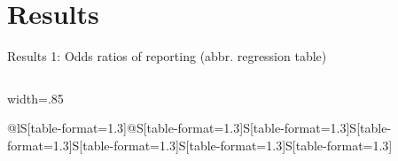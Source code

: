 \documentclass{beamer}
\begin{document}
	\section{Results}
	\begin{frame}{\small Results 1: Odds ratios of reporting (abbr. regression table)}
		\begin{columns}
			\column{\dimexpr\paperwidth-20pt}
			\centering
			\begin{adjustbox}{width=.85\textwidth}

				\begin{tabular}{@{\hspace*{1.5em}}lS[table-format=1.3]@{\hspace{1cm}}S[table-format=1.3]S[table-format=1.3]S[table-format=1.3]S[table-format=1.3]S[table-format=1.3]S[table-format=1.3]}
					

\end{tabular}
\end{adjustbox}
\end{columns}
\end{frame}
\end{document}
